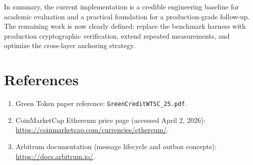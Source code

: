 \documentclass[11pt]{article}
\begin{document}
In summary, the current implementation is a credible engineering baseline for academic evaluation and a practical foundation for a production-grade follow-up. The remaining work is now clearly defined: replace the benchmark harness with production cryptographic verification, extend repeated measurements, and optimize the cross-layer anchoring strategy.

\section*{References}
\begin{enumerate}
  \item Green Token paper reference: \texttt{GreenCreditWTSC\_25.pdf}.
  \item CoinMarketCap Ethereum price page (accessed April 2, 2026): \url{https://coinmarketcap.com/currencies/ethereum/}.
  \item Arbitrum documentation (message lifecycle and outbox concepts): \url{https://docs.arbitrum.io/}.
\end{enumerate}
\end{document}
